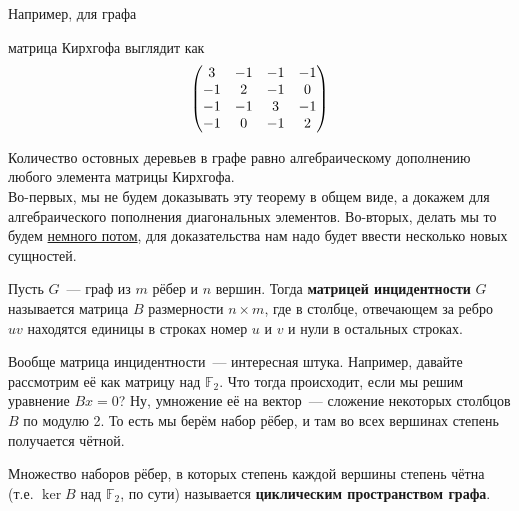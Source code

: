 \documentclass{article}
\begin{document}
    \begin{example}
        Например, для графа
        \begin{figure}[H]
        \end{figure}\noindent
        матрица Кирхгофа выглядит как
        $$
        \left(\begin{matrix}
            3 & -1 & -1 & -1\\
            -1 & 2 & -1 & 0\\
            -1 & -1 & 3 & -1\\
            -1 & 0 & -1 & 2
        \end{matrix}\right)
        $$
    \end{example}
    \begin{theorem}
        \label{Теорема Кирхгофа}
        Количество остовных деревьев в графе равно алгебраическому дополнению любого элемента матрицы Кирхгофа.\\
        Во-первых, мы не будем доказывать эту теорему в общем виде, а докажем для алгебраического пополнения диагональных элементов. Во-вторых, делать мы то будем \hyperref[Доказательство теоремы Кирхгофа]{немного потом}, для доказательства нам надо будет ввести несколько новых сущностей.
    \end{theorem}
    \begin{definition}
        Пусть $G$~--- граф из $m$ рёбер и $n$ вершин. Тогда \textbf{матрицей инцидентности} $G$ называется матрица $B$ размерности $n\times m$, где в столбце, отвечающем за ребро $uv$ находятся единицы в строках номер $u$ и $v$ и нули в остальных строках.
    \end{definition}
    \begin{remark}
        Вообще матрица инцидентности~--- интересная штука. Например, давайте рассмотрим её как матрицу над $\mathbb F_2$. Что тогда происходит, если мы решим уравнение $Bx=0$? Ну, умножение её на вектор~--- сложение некоторых столбцов $B$ по модулю 2. То есть мы берём набор рёбер, и там во всех вершинах степень получается чётной.
    \end{remark}
    \begin{definition}
        Множество наборов рёбер, в которых степень каждой вершины степень чётна (т.е. $\ker B$ над $\mathbb F_2$, по сути) называется \textbf{циклическим пространством графа}.
    \end{definition}
\end{document}
